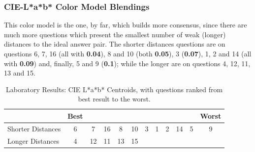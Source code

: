 \subsubsection{CIE-L*a*b* Color Model Blendings}
\label{subsubsec:lchcolormodel}
%
This color model is the one, by far, which builds more consensus, since there are much more questions which present the smallest number of weak (longer) distances to the ideal answer pair.
The shorter distances questions are on questions 6, 7, 16 (all with \textbf{0.04}), 8 and 10 (both \textbf{0.05}), 3 (\textbf{0.07}), 1, 2 and 14 (all with \textbf{0.09}) and, finally, 5 and 9 (\textbf{0.1}); while the longer are on questions
4, 12, 11, 13 and 15.
%
\begin{table}[htbp]
  \centering
  \begin{tabular}{@{}lccccccccccc@{}}
  \toprule
      & \multicolumn{1}{l}{Best}                        & \multicolumn{1}{l}{}                            & \multicolumn{1}{l}{}                           & \multicolumn{1}{l}{}                            & \multicolumn{1}{l}{}                            & \multicolumn{1}{l}{}                            & \multicolumn{1}{l}{}                            & \multicolumn{1}{l}{}                            & \multicolumn{1}{l}{}                            & \multicolumn{1}{l}{}                                                   & \multicolumn{1}{l}{Worst}                             \\ \midrule
  \multicolumn{1}{l|}{Shorter Distances} & \multicolumn{1}{c||}{\cellcolor[HTML]{FF8000}6} & \multicolumn{1}{c||}{\cellcolor[HTML]{0000FF}7}  & \multicolumn{1}{c||}{\cellcolor[HTML]{FF007F}16} & \multicolumn{1}{c||}{\cellcolor[HTML]{FF0000}8}  & \multicolumn{1}{c||}{\cellcolor[HTML]{0080FF}10} & \multicolumn{1}{c||}{\cellcolor[HTML]{80FF00}3} & \multicolumn{1}{c||}{\cellcolor[HTML]{FFFF00}1} & \multicolumn{1}{c||}{\cellcolor[HTML]{FF00FF}2} & \multicolumn{1}{c||}{\cellcolor[HTML]{8000FF}14} & \multicolumn{1}{c||}{\cellcolor[HTML]{FF0080}5} & \multicolumn{1}{c|}{\cellcolor[HTML]{00FF80}9}\\ \midrule
  \multicolumn{1}{l|}{Longer Distances}  & \multicolumn{1}{c||}{\cellcolor[HTML]{7F00FF}4} & \multicolumn{1}{c||}{\cellcolor[HTML]{80FF00}12} & \multicolumn{1}{c||}{\cellcolor[HTML]{FF8000}11} & \multicolumn{1}{c||}{\cellcolor[HTML]{0080FF}13} & \multicolumn{1}{c|}{\cellcolor[HTML]{00FF80}15} & & & & & & \\ \bottomrule
  \end{tabular}
  \caption[Laboratory Results: CIE L*a*b* Centroids]{Laboratory Results: CIE L*a*b* Centroids, with questions ranked from best result to the worst.}
  \label{table:centroids_labresults}
\end{table}
%

